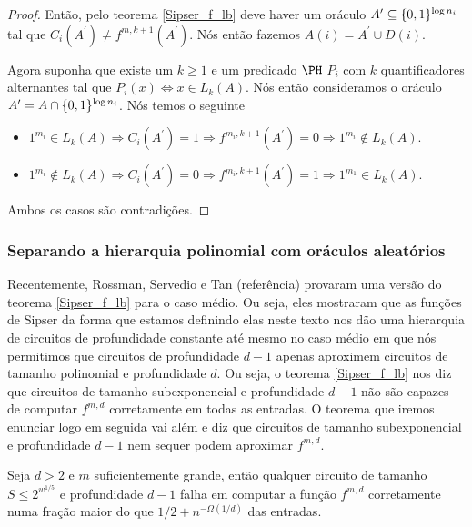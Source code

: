 \begin{proof}
Então, pelo teorema \ref{Sipser_f_lb} deve haver um oráculo $A^{\prime} \subseteq \{0, 1\}^{\log n_{i}}$ tal que $C_{i}(A^{\prime}) \neq f^{m, k + 1}(A^{\prime})$. Nós então fazemos $A(i) = A^{\prime} \cup D(i)$.

Agora suponha que existe um $k \geq 1$ e um predicado $\PH$ $P_{i}$ com $k$ quantificadores alternantes tal que $P_{i}(x) \iff x \in L_{k}(A)$. Nós então consideramos o oráculo $A^{\prime} = A \cap \{0, 1\}^{\log n_{i}}$. Nós temos o seguinte

\begin{itemize}

	\item $1^{m_{i}} \in L_{k}(A) \Rightarrow C_{i}(A^{\prime}) = 1 \Rightarrow f^{m_{i}, k + 1}(A^{\prime}) = 0 \Rightarrow 1^{m_{i}} \not\in L_{k}(A)$.
	
	\item $1^{m_{i}} \not\in L_{k}(A) \Rightarrow C_{i}(A^{\prime}) = 0 \Rightarrow f^{m_{i}, k + 1}(A^{\prime}) = 1 \Rightarrow 1^{m_{1}} \in L_{k}(A)$.

\end{itemize}

Ambos os casos são contradições.

\end{proof}

\subsubsection{Separando a hierarquia polinomial com oráculos aleatórios}

Recentemente, Rossman, Servedio e Tan (referência) provaram uma versão do teorema \ref{Sipser_f_lb} para o caso médio. Ou seja, eles mostraram que as funções de Sipser da forma que estamos definindo elas neste texto nos dão uma hierarquia de circuitos de profundidade constante até mesmo no caso médio em que nós permitimos que circuitos de profundidade $d - 1$ apenas aproximem circuitos de tamanho polinomial e profundidade $d$. Ou seja, o teorema \ref{Sipser_f_lb} nos diz que circuitos de tamanho subexponencial e profundidade $d - 1$ não são capazes de computar $f^{m, d}$ corretamente em todas as entradas. O teorema que iremos enunciar logo em seguida vai além e diz que circuitos de tamanho subexponencial e profundidade $d -1$ nem sequer podem aproximar $f^{m, d}$.

\begin{teo} \label{Sipser_f_lb_app}

Seja $d > 2$ e $m$ suficientemente grande, então qualquer circuito de tamanho $S \leq 2^{w^{1/5}}$ e profundidade $d - 1$ falha em computar a função $f^{m, d}$ corretamente numa fração maior do que $1/2 + n^{-\Omega(1/d)}$ das entradas.

\end{teo}

